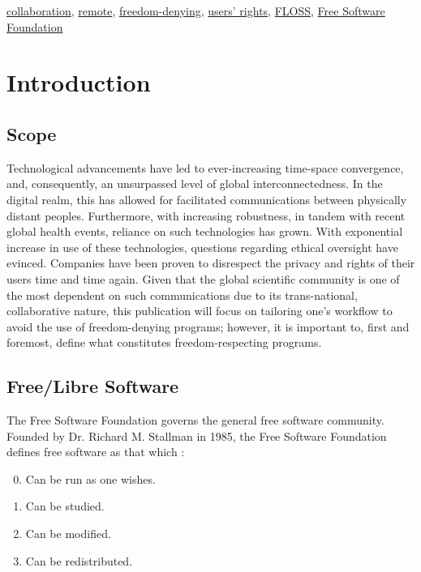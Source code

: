 \documentclass[conference]{IEEEtran}
\begin{document}
\begin{IEEEkeywords}
  \underline{collaboration}, \underline{remote}, \underline{freedom-denying}, \underline{users' rights}, \underline{FLOSS}, \underline{Free Software Foundation}
\end{IEEEkeywords}

\section{Introduction}

\subsection{Scope}

Technological advancements have led to ever-increasing time-space convergence, and, consequently, an unsurpassed level of global interconnectedness. In the digital realm, this has allowed for facilitated communications between physically distant peoples. Furthermore, with increasing robustness, in tandem with recent global health events, reliance on such technologies has grown. With exponential increase in use of these technologies, questions regarding ethical oversight have evinced. Companies have been proven to disrespect the privacy and rights of their users time and time again. Given that the global scientific community is one of the most dependent on such communications due to its trans-national, collaborative nature, this publication will focus on tailoring one's workflow to avoid the use of freedom-denying programs; however, it is important to, first and foremost, define what constitutes freedom-respecting programs.

\subsection{Free/Libre Software}

The Free Software Foundation governs the general free software community. Founded by Dr. Richard M. Stallman in 1985, the Free Software Foundation defines free software as that which \cite{DefineFree}: 

\begin{enumerate}

    \setcounter{enumi}{-1}

  \item Can be run as one wishes.

  \item Can be studied.

  \item Can be modified.

  \item Can be redistributed.

\end{enumerate}
\end{document}
